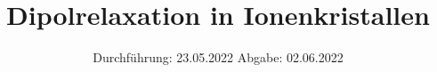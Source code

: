 

\subject{V48}
\title{Dipolrelaxation in Ionenkristallen}
\date{%
  Durchführung: 23.05.2022
  \hspace{3em}
  Abgabe: 02.06.2022
}



\maketitle
\thispagestyle{empty}
\tableofcontents
\newpage







\printbibliography{}


